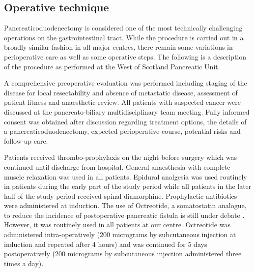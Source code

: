 \subsection{Operative technique}
Pancreaticoduodenectomy is considered one of the most technically challenging operations on the gastrointestinal tract. 
While the procedure is carried out in a broadly similar fashion in all major centres, there remain some variations in perioperative care as well as some operative steps. 
The following is a description of the procedure as performed at the West of Scotland Pancreatic Unit.

A comprehensive preoperative evaluation was performed including staging of the disease for local resectability and absence of metastatic disease, assessment of patient fitness and anaesthetic review. 
All patients with suspected cancer were discussed at the pancreato-biliary multidisciplinary team meeting. 
Fully informed consent was obtained after discussion regarding treatment options, the details of a pancreaticoduodenectomy, expected perioperative course, potential risks and follow-up care.

Patients received thrombo-prophylaxis on the night before surgery which was continued until discharge from hospital. 
General anaesthesia with complete muscle relaxation was used in all patients. 
Epidural analgesia was used routinely in patients during the early part of the study period while all patients in the later half of the study period received spinal diamorphine. 
Prophylactic antibiotics were administered at induction. 
The use of Octreotide, a somatostatin analogue, to reduce the incidence of postoperative pancreatic fistula is still under debate \parencite{halloran_complications_2002, li_pancreatic_2004} .
However, it was routinely used in all patients at our centre. 
Octreotide was administered intra-operatively (200 micrograms by subcutaneous injection at induction and repeated after 4 hours) and was continued for 5 days postoperatively (200 micrograms by subcutaneous injection administered three times a day).

